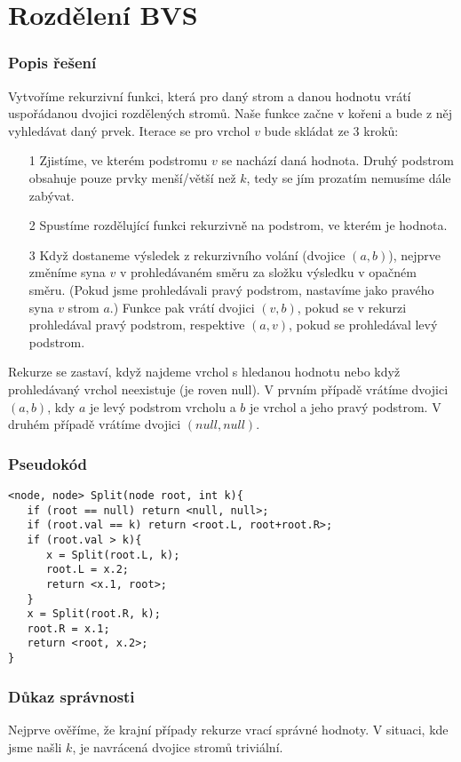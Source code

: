 \documentclass[11pt,a4paper]{article}
\begin{document}
\part*{Rozdělení BVS}
\section{Popis řešení}
Vytvoříme rekurzivní funkci, která pro daný strom a danou hodnotu vrátí uspořádanou dvojici rozdělených stromů. Naše funkce začne v kořeni a bude z něj vyhledávat daný prvek. Iterace se pro vrchol $v$ bude skládat ze 3 kroků:
\begin{enumerate}
\item[1]
Zjistíme, ve kterém podstromu $v$ se nachází daná hodnota. Druhý podstrom obsahuje pouze prvky menší/větší než $k$, tedy se jím prozatím nemusíme dále zabývat.
\item[2]
Spustíme rozdělující funkci rekurzivně na podstrom, ve kterém je hodnota.
\item[3]
Když dostaneme výsledek z rekurzivního volání (dvojice $(a,b)$), nejprve změníme syna $v$ v prohledávaném směru za složku výsledku v opačném směru. (Pokud jsme prohledávali pravý podstrom, nastavíme jako pravého syna $v$ strom $a$.) Funkce pak vrátí dvojici $(v,b)$, pokud se v rekurzi prohledával pravý podstrom, respektive $(a, v)$, pokud se prohledával levý podstrom. 
\end{enumerate}
Rekurze se zastaví, když najdeme vrchol s hledanou hodnotu nebo když prohledávaný vrchol neexistuje (je roven null). V prvním případě vrátíme dvojici $(a,b)$, kdy $a$ je levý podstrom vrcholu a $b$ je vrchol a jeho pravý podstrom. V druhém případě vrátíme dvojici $(null, null)$.
\section{Pseudokód}
\begin{verbatim}
<node, node> Split(node root, int k){
   if (root == null) return <null, null>;
   if (root.val == k) return <root.L, root+root.R>;
   if (root.val > k){
      x = Split(root.L, k);
      root.L = x.2;
      return <x.1, root>;
   }
   x = Split(root.R, k);
   root.R = x.1;
   return <root, x.2>;
}
\end{verbatim}

\section{Důkaz správnosti}
Nejprve ověříme, že krajní případy rekurze vrací správné hodnoty. V situaci, kde jsme našli $k$, je navrácená dvojice stromů triviální.\\
\end{document}
